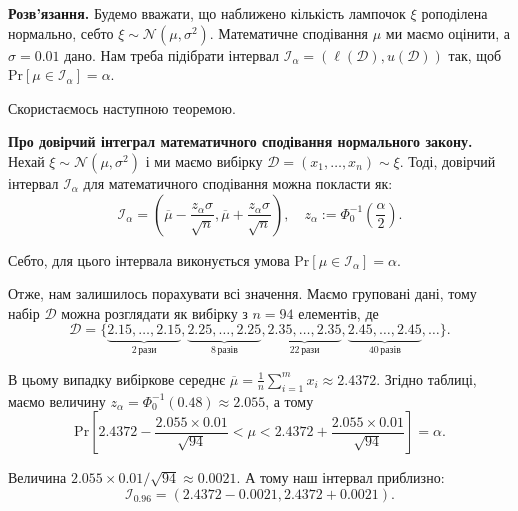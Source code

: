 \documentclass{../hw_template}
\begin{document}
\textbf{Розв'язання.} Будемо вважати, що наближено кількість лампочок $\xi$ роподілена нормально, себто $\xi \sim \mathcal{N}(\mu,\sigma^2)$. Математичне сподівання $\mu$ ми маємо оцінити, а $\sigma=0.01$ дано. Нам треба підібрати інтервал $\mathcal{I}_{\alpha} = (\ell(\mathcal{D}), u(\mathcal{D}))$ так, щоб $\text{Pr}[\mu \in \mathcal{I}_{\alpha}] = \alpha$. 

Скористаємось наступною теоремою.

\begin{theorem}
    \textbf{Про довірчий інтеграл математичного сподівання нормального закону.} Нехай $\xi \sim \mathcal{N}(\mu,\sigma^2)$ і ми маємо вибірку $\mathcal{D} = (x_1,\dots,x_n) \sim \xi$. Тоді, довірчий інтервал $\mathcal{I}_{\alpha}$ для математичного сподівання можна покласти як:
    \begin{equation*}
        \mathcal{I}_{\alpha} = \left(\overline{\mu} - \frac{z_{\alpha}\sigma}{\sqrt{n}}, \overline{\mu} + \frac{z_{\alpha}\sigma}{\sqrt{n}}\right), \quad z_{\alpha} := \Phi_0^{-1}\left(\frac{\alpha}{2}\right).
    \end{equation*}

    Себто, для цього інтервала виконується умова $\text{Pr}[\mu \in \mathcal{I}_{\alpha}] = \alpha$.
\end{theorem}

Отже, нам залишилось порахувати всі значення. Маємо груповані дані, тому набір $\mathcal{D}$ можна розглядати як вибірку з $n=94$ елементів, де
\begin{equation*}
    \mathcal{D} = \{\underbrace{2.15, \dots, 2.15}_{2 \, \text{рази}}, \underbrace{2.25, \dots, 2.25}_{8 \, \text{разів}}, \underbrace{2.35, \dots, 2.35}_{22 \, \text{рази}}, \underbrace{2.45, \dots, 2.45}_{40 \, \text{разів}}, \dots\}.
\end{equation*}

В цьому випадку вибіркове середнє $\overline{\mu} = \frac{1}{n}\sum_{i=1}^m x_i \approx 2.4372$. Згідно таблиці, маємо величину $z_{\alpha} = \Phi_0^{-1}(0.48) \approx 2.055$, а тому
\begin{equation*}
    \text{Pr}\left[2.4372 - \frac{2.055 \times 0.01}{\sqrt{94}} < \mu < 2.4372 + \frac{2.055 \times 0.01}{\sqrt{94}}\right] = \alpha.
\end{equation*}

Величина $2.055 \times 0.01/\sqrt{94} \approx 0.0021$. А тому наш інтервал приблизно:
\begin{equation*}
    \mathcal{I}_{0.96} = (2.4372 - 0.0021, 2.4372 + 0.0021).
\end{equation*}
\end{document}
